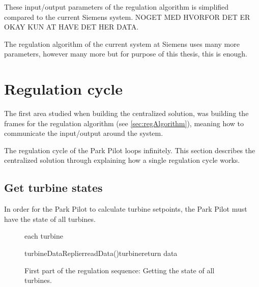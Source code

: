 These input/output parameters of the regulation algorithm is simplified compared to the current Siemens system. NOGET MED HVORFOR DET ER OKAY KUN AT  HAVE DET HER DATA.

 The regulation algorithm of the current system at Siemens uses many more parameters, however  many more but for purpose of this thesis, this is enough. 



\section{Regulation cycle}\label{sec:currentSystemCen} 

The first area studied when building the centralized solution, was building the frames for the regulation algorithm (see \cref{sec:regAlgorithm}), meaning how to communicate the input/output around the system. 

The regulation cycle of the Park Pilot loops infinitely. This section describes the centralized solution through explaining how a single regulation cycle works.

\subsection{Get turbine states}\label{sec:getTurbineStates}

In order for the Park Pilot to calculate turbine setpoints, the Park Pilot must have the state of all turbines.

\begin{figure}
	\centering
	\begin{sequencediagram} %
	
		\begin{sdblock}{each turbine}{}
			\begin {call}{turbineDataReplier}{readData()}{turbine}{return data}
			\end {call}
		\end{sdblock}				
	\end{sequencediagram}

	\caption[First part of the regulation cycle]{
		\label{fig:getStatesOfTurbines} 
		\footnotesize{%
			First part of the regulation sequence: Getting the state of all turbines.
		}
	}
\end{figure}

